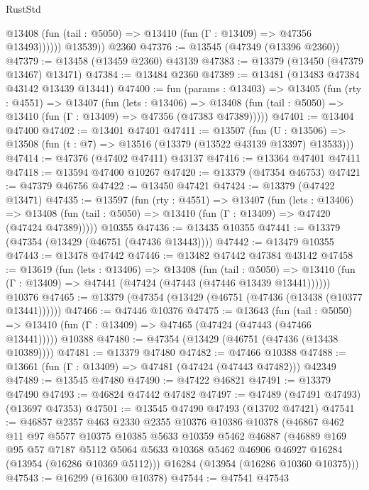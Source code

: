 \begin{lexlean}{RustStd}
\begin{coremodule}
              @13408 (fun (tail : @5050) => @13410 (fun (Γ : @13409) => @47356 @13493))))))
        @13539))
    @2360
@47376 := @13545 (@47349 (@13396 @2360))
@47379 := @13458 (@13459 @2360) @43139
@47383 := @13379 (@13450 (@47379 @13467) @13471)
@47384 := @13484 @2360
@47389 := @13481 (@13483 @47384 @43142 @13439 @13441)
@47400 := fun (params : @13403) =>
  @13405
    (fun (rty : @4551) =>
    @13407
      (fun (lets : @13406) =>
      @13408 (fun (tail : @5050) => @13410 (fun (Γ : @13409) => @47356 (@47383 @47389)))))
@47401 := @13404 @47400
@47402 := @13401 @47401
@47411 := @13507
    (fun (U : @13506) => @13508 (fun (t : @7) => @13516 (@13379 (@13522 @43139 @13397) @13533)))
@47414 := @47376 (@47402 @47411) @43137
@47416 := @13364 @47401 @47411
@47418 := @13594 @47400 @10267
@47420 := @13379 (@47354 @46753)
@47421 := @47379 @46756
@47422 := @13450 @47421
@47424 := @13379 (@47422 @13471)
@47435 := @13597
    (fun (rty : @4551) =>
    @13407
      (fun (lets : @13406) =>
      @13408 (fun (tail : @5050) => @13410 (fun (Γ : @13409) => @47420 (@47424 @47389)))))
    @10355
@47436 := @13435 @10355
@47441 := @13379 (@47354 (@13429 (@46751 (@47436 @13443))))
@47442 := @13479 @10355
@47443 := @13478 @47442
@47446 := @13482 @47442 @47384 @43142
@47458 := @13619
    (fun (lets : @13406) =>
    @13408
      (fun (tail : @5050) =>
      @13410 (fun (Γ : @13409) => @47441 (@47424 (@47443 (@47446 @13439 @13441))))))
    @10376
@47465 := @13379 (@47354 (@13429 (@46751 (@47436 (@13438 (@10377 @13441))))))
@47466 := @47446 @10376
@47475 := @13643
    (fun (tail : @5050) => @13410 (fun (Γ : @13409) => @47465 (@47424 (@47443 (@47466 @13441)))))
    @10388
@47480 := @47354 (@13429 (@46751 (@47436 (@13438 @10389))))
@47481 := @13379 @47480
@47482 := @47466 @10388
@47488 := @13661 (fun (Γ : @13409) => @47481 (@47424 (@47443 @47482))) @42349
@47489 := @13545 @47480
@47490 := @47422 @46821
@47491 := @13379 @47490
@47493 := @46824 @47442 @47482
@47497 := @47489 (@47491 @47493) (@13697 @47353)
@47501 := @13545 @47490 @47493 (@13702 @47421)
@47541 := @46857
    @2357
    @463
    @2330
    @2355
    @10376
    @10386
    @10378
    (@46867
      @462
      @11
      @97
      @5577
      @10375
      @10385
      @5633
      @10359
      @5462
      @46887
      (@46889
        @169
        @95
        @57
        @7187
        @5112
        @5064
        @5633
        @10368
        @5462
        @46906
        @46927
        @16284
        (@13954 (@16286 @10369 @5112)))
      @16284
      (@13954 (@16286 @10360 @10375)))
@47543 := @16299 (@16300 @10378)
@47544 := @47541 @47543

\end{coremodule}
\end{lexlean}
